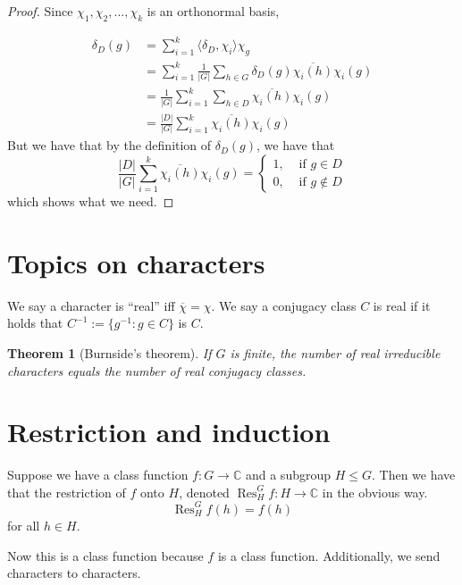 \documentclass[]{report}
\newtheorem{theorem}{Theorem}
\theoremstyle{definition}
\numberwithin{theorem}{section}
\numberwithin{equation}{section}
\newcommand{\res}{\operatorname{Res}}
\begin{document}
\begin{proof}
	Since $\chi_1, \chi_2, ..., \chi_k$ is an orthonormal basis,
	
	\begin{align*}
		\delta_D(g) &= \sum_{i = 1}^k \langle \delta_D, \chi_i \rangle \chi_g\\
		&= \sum_{i = 1}^k \frac{1}{|G|} \sum_{h \in G} \delta_D(g) \overline{\chi_i(h)} \chi_i(g)\\
		&= \frac{1}{|G|}\sum_{i = 1}^k \sum_{h \in D} \overline{\chi_i(h)} \chi_i(g)\\
		&= \frac{|D|}{|G|}\sum_{i = 1}^k \overline{\chi_i(h)} \chi_i(g)
	\end{align*}
	But we have that by the definition of $\delta_D(g)$, we have that 
	\begin{equation}
		\frac{|D|}{|G|}\sum_{i = 1}^k \overline{\chi_i(h)} \chi_i(g) = \begin{cases}
			1, & \text{ if } g \in D\\
			0, & \text{ if } g \notin D
		\end{cases}
	\end{equation}
	which shows what we need. 
\end{proof}
\section{Topics on characters}

We say a character is ``real'' iff $\overline{\chi} = \chi$. We say a conjugacy class $C$ is real if it holds that $C^{-1} := \{g^{-1}: g \in C\}$ is $C$.

\begin{theorem}[Burnside's theorem]
	If $G$ is finite, the number of real irreducible characters equals the number of real conjugacy classes.
\end{theorem}


\section{Restriction and induction}

Suppose we have a class function $f: G \rightarrow \mathbb{C}$ and a subgroup $H \leq G$. Then we have that the restriction of $f$ onto $H$, denoted $\res^G_H f : H \rightarrow \mathbb{C}$ in the obvious way. 
\begin{equation}
	\res^G_H f(h) = f(h)
\end{equation}
for all $h \in H$. 

Now this is a class function because $f$ is a class function. Additionally, we send characters to characters. 
\end{document}
